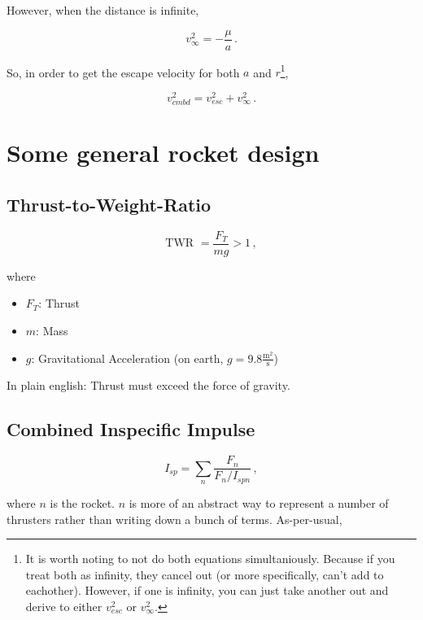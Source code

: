 \documentclass[12pt,a4paper]{article}
\numberwithin{equation}{section}
\begin{document}
However, when the distance is infinite,

\begin{equation}
	v_{\infty}^2 = -\frac{\mu}{a} \,.
\end{equation}

So, in order to get the escape velocity for both $a$ and $r$\footnote{It is worth noting to not do both equations simultaniously. Because if you treat both as infinity, they cancel out (or more specifically, can't add to eachother). However, if one is infinity, you can just take another out and derive to either $v_{esc}^2$ or $v_{\infty}^2$.}, 

\begin{equation}
	v_{cmbd}^2 = v_{esc}^2 + v_{\infty}^2 \,.
\end{equation}

\newpage

\section{Some general rocket design}

\subsection{Thrust-to-Weight-Ratio}

\begin{equation}
	\text{TWR } = \frac{F_T}{m g} > 1 \,,
\end{equation}

where

\begin{itemize}
	\item $F_T$: Thrust
	\item $m$: Mass
	\item $g$: Gravitational Acceleration (on earth, $g = 9.8 \frac{\text{m}^2}{\text{s}}$)
\end{itemize}

In plain english: Thrust must exceed the force of gravity.

\subsection{Combined Inspecific Impulse}

\begin{equation}
	I_{sp} = \sum_n \frac{F_n}{F_n / I_{sp n}} \,,
\end{equation}

where $n$ is the rocket. $n$ is more of an abstract way to represent a number of thrusters rather than writing down a bunch of terms. As-per-usual, 
\end{document}
